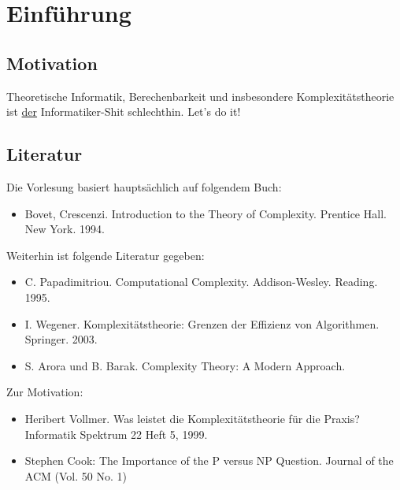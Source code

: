 



\chapter{Einführung} %
\label{cha:einfuhrung}



\section{Motivation}

Theoretische Informatik, Berechenbarkeit und insbesondere Komplexitätstheorie ist \underline{der} Informatiker-Shit schlechthin. Let's do it!



\section{Literatur}

Die Vorlesung basiert hauptsächlich auf folgendem Buch:
\begin{itemize}
    \item Bovet, Crescenzi. Introduction to the Theory of Complexity. Prentice Hall. New York. 1994.
\end{itemize}

Weiterhin ist folgende Literatur gegeben:
\begin{itemize}
    \item C. Papadimitriou. Computational Complexity. Addison-Wesley. Reading. 1995.
    \item I. Wegener. Komplexitätstheorie: Grenzen der Effizienz von Algorithmen. Springer. 2003.
    \item S. Arora und B. Barak. Complexity Theory: A Modern Approach. 
\end{itemize}

Zur Motivation:
\begin{itemize}
    \item Heribert Vollmer. Was leistet die Komplexitätstheorie für die Praxis? Informatik Spektrum 22 Heft 5, 1999.
    \item Stephen Cook: The Importance of the P versus NP Question. Journal of the ACM (Vol. 50 No. 1)
\end{itemize}








